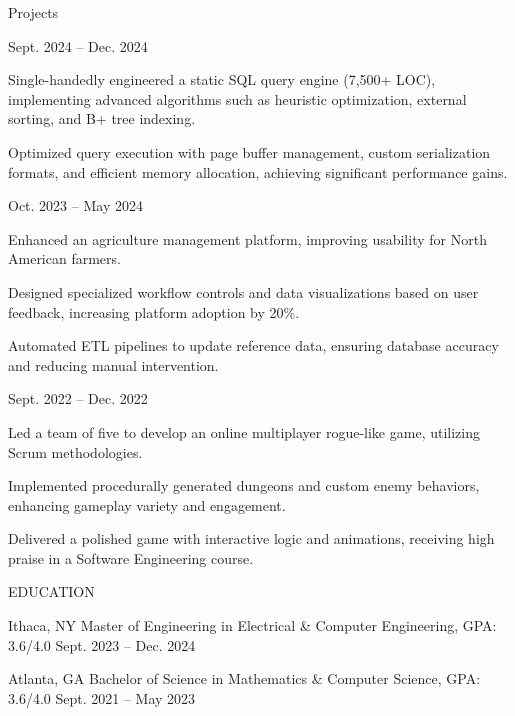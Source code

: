 \documentclass[10pt]{article}
\begin{document}
\begin{customsection}{Projects}

    {Sept. 2024 -- Dec. 2024}
    {
        \item Single-handedly engineered a static SQL query engine (7,500+ LOC), implementing advanced algorithms such as heuristic optimization, external sorting, and B+ tree indexing.
        \item Optimized query execution with page buffer management, custom serialization formats, and efficient memory allocation, achieving significant performance gains.
    }

    {Oct. 2023 -- May 2024}
    {
        \item Enhanced an agriculture management platform, improving usability for North American farmers.
        \item Designed specialized workflow controls and data visualizations based on user feedback, increasing platform adoption by 20\%.
        \item Automated ETL pipelines to update reference data, ensuring database accuracy and reducing manual intervention.
    }

    {Sept. 2022 -- Dec. 2022}
    {
        \item Led a team of five to develop an online multiplayer rogue-like game, utilizing Scrum methodologies.
        \item Implemented procedurally generated dungeons and custom enemy behaviors, enhancing gameplay variety and engagement.
        \item Delivered a polished game with interactive logic and animations, receiving high praise in a Software Engineering course.
    }

\end{customsection}

\begin{customsection}{EDUCATION}

    {Ithaca, NY}
    {Master of Engineering in Electrical \& Computer Engineering, GPA: 3.6/4.0}
    {Sept. 2023 -- Dec. 2024}

    {Atlanta, GA}
    {Bachelor of Science in Mathematics \& Computer Science, GPA: 3.6/4.0}
    {Sept. 2021 -- May 2023}

\end{customsection}

\end{document}
